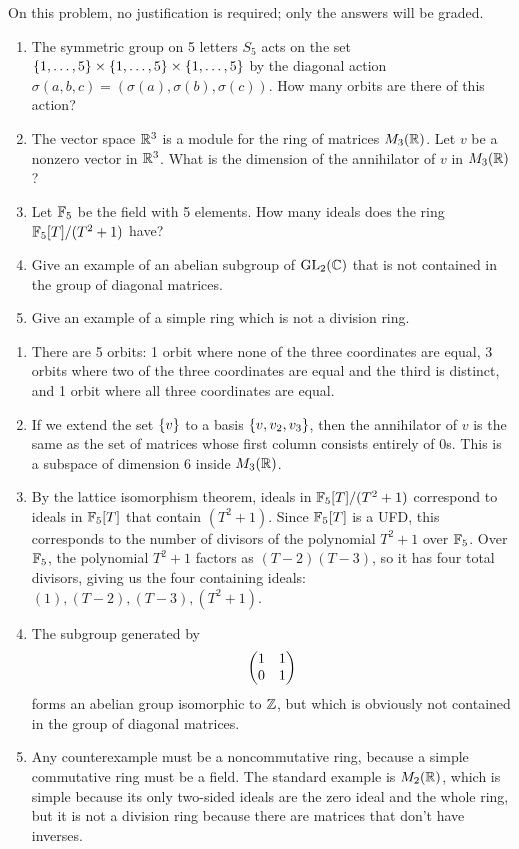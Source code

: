 %
\begin{question}[subtitle=August 2024 Problem 1,ID=Aug24_1]
On this problem, no justification is required; only the answers will be graded.
\begin{enumerate}
    \item The symmetric group on 5 letters $S_5$ acts on the set $\{1,\dots,5\} \times \{1,\dots,5\} \times \{1,\dots,5\}$ by the diagonal action $\sigma(a,b,c) = (\sigma(a),\sigma(b),\sigma(c))$. How many orbits are there of this action?
    \item The vector space $\mathbb{R}^3$ is a module for the ring of matrices $M_3(\mathbb{R})$. Let $v$ be a nonzero vector in $\mathbb{R}^3$. What is the dimension of the annihilator of $v$ in $M_3(\mathbb{R})$?
    \item Let $\mathbb{F}_5$ be the field with 5 elements. How many ideals does the ring $\mathbb{F}_5[T]/(T^2+1)$ have?
    \item Give an example of an abelian subgroup of $\operatorname{GL}_2(\mathbb{C})$ that is not contained in the group of diagonal matrices. %
    \item Give an example of a simple ring which is not a division ring. %
\end{enumerate}
\end{question}
\begin{solution}
\begin{enumerate}
    \item There are 5 orbits: 1 orbit where none of the three coordinates are equal, 3 orbits where two of the three coordinates are equal and the third is distinct, and 1 orbit where all three coordinates are equal.
    \item If we extend the set $\{v\}$ to a basis $\{v,v_2,v_3\}$, then the annihilator of $v$ is the same as the set of matrices whose first column consists entirely of 0s. This is a subspace of dimension 6 inside $M_3(\mathbb{R})$.
    \item By the lattice isomorphism theorem, ideals in $\mathbb{F}_5[T]/(T^2+1)$ correspond to ideals in $\mathbb{F}_5[T]$ that contain $(T^2+1)$. Since $\mathbb{F}_5[T]$ is a UFD, this corresponds to the number of divisors of the polynomial $T^2+1$ over $\mathbb{F}_5$. Over $\mathbb{F}_5$, the polynomial $T^2+1$ factors as $(T-2)(T-3)$, so it has four total divisors, giving us the four containing ideals: $(1), (T-2), (T-3), (T^2+1)$.
    \item The subgroup generated by
    \[\begin{pmatrix}{1} & {1}\\{0} & {1}\end{pmatrix}\]
    forms an abelian group isomorphic to $\mathbb{Z}$, but which is obviously not contained in the group of diagonal matrices.
    \item Any counterexample must be a noncommutative ring, because a simple commutative ring must be a field. The standard example is $M_2(\mathbb{R})$, which is simple because its only two-sided ideals are the zero ideal and the whole ring, but it is not a division ring because there are matrices that don't have inverses.
\end{enumerate}
\end{solution}

